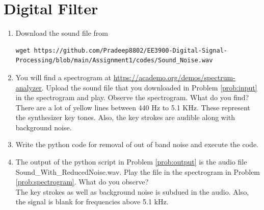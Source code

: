 \documentclass[journal,12pt,twocolumn]{IEEEtran}
\renewcommand\thesection{\arabic{section}}
\begin{document}
\section{Digital Filter}
\begin{enumerate}[label=\thesection.\arabic*
,ref=\thesection.\theenumi]
\item
\label{prob:input}
Download the sound file from  
\begin{lstlisting}
wget https://github.com/Pradeep8802/EE3900-Digital-Signal-Processing/blob/main/Assignment1/codes/Sound_Noise.wav
\end{lstlisting}
\item
\label{prob:spectrogram}
You will find a spectrogram at \href{https://academo.org/demos/spectrum-analyzer}{\url{https://academo.org/demos/spectrum-analyzer}}. 
%
Upload the sound file that you downloaded in Problem \ref{prob:input} in the spectrogram  and play.  Observe the spectrogram. What do you find?
\\
%
\solution There are a lot of yellow lines between 440 Hz to 5.1 KHz.  These represent the synthesizer key tones. Also, the key strokes
are audible along with background noise.
\item
\label{prob:output}
Write the python code for removal of out of band noise and execute the code.
\\
\solution

%
\item
The output of the python script in Problem \ref{prob:output} is the audio file Sound\_With\_ReducedNoise.wav. Play the file in the spectrogram in Problem \ref{prob:spectrogram}. What do you observe?
\\
\solution The key strokes as well as background noise is subdued in the audio.  Also,  the signal is blank for frequencies above 5.1 kHz.

\end{enumerate}
\end{document}
